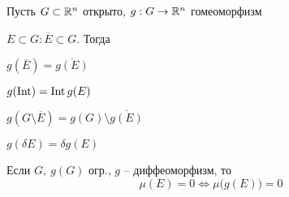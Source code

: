     \begin{lemma} %
        Пусть $G \subset \mathbb{R}^n$ открыто, $g : G \rightarrow \mathbb{R}^n$ гомеоморфизм
        \par $E \subset G : \overline E \subset G$. Тогда
        \par $g(\overline E) = \overline {g(E)}$
        \par $g(\operatorname{Int}) = \operatorname{Int} g(E)$
        \par $g(G \setminus \overline E) = g(G) \setminus \overline {g(E)}$
        \par $g(\delta E) = \delta g(E)$
        \par Если $G, \ g(G)$ огр., $g$ -- диффеоморфизм, то
        \[
            \mu(E) = 0 \Leftrightarrow \mu\big(g(E)\big) = 0    
        \]
    \end{lemma}
